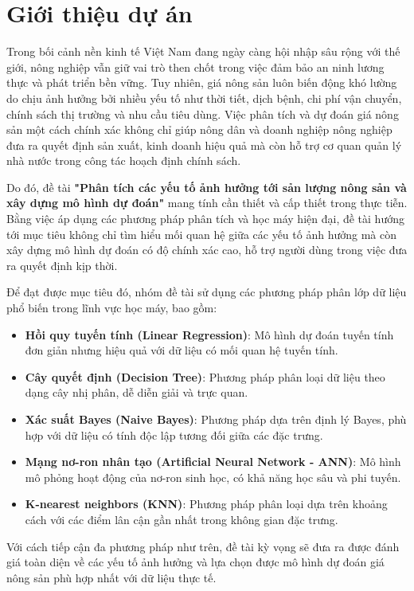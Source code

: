 \section{Giới thiệu dự án}

Trong bối cảnh nền kinh tế Việt Nam đang ngày càng hội nhập sâu rộng với thế giới, nông nghiệp vẫn giữ vai trò then chốt trong việc đảm bảo an ninh lương thực và phát triển bền vững. Tuy nhiên, giá nông sản luôn biến động khó lường do chịu ảnh hưởng bởi nhiều yếu tố như thời tiết, dịch bệnh, chi phí vận chuyển, chính sách thị trường và nhu cầu tiêu dùng. Việc phân tích và dự đoán giá nông sản một cách chính xác không chỉ giúp nông dân và doanh nghiệp nông nghiệp đưa ra quyết định sản xuất, kinh doanh hiệu quả mà còn hỗ trợ cơ quan quản lý nhà nước trong công tác hoạch định chính sách.

Do đó, đề tài \textbf{"Phân tích các yếu tố ảnh hưởng tới sản lượng nông sản và xây dựng mô hình dự đoán"} mang tính cần thiết và cấp thiết trong thực tiễn. Bằng việc áp dụng các phương pháp phân tích và học máy hiện đại, đề tài hướng tới mục tiêu không chỉ tìm hiểu mối quan hệ giữa các yếu tố ảnh hưởng mà còn xây dựng mô hình dự đoán có độ chính xác cao, hỗ trợ người dùng trong việc đưa ra quyết định kịp thời.

Để đạt được mục tiêu đó, nhóm đề tài sử dụng các phương pháp phân lớp dữ liệu phổ biến trong lĩnh vực học máy, bao gồm:

\begin{itemize}
    \item \textbf{Hồi quy tuyến tính (Linear Regression)}: Mô hình dự đoán tuyến tính đơn giản nhưng hiệu quả với dữ liệu có mối quan hệ tuyến tính.
    \item \textbf{Cây quyết định (Decision Tree)}: Phương pháp phân loại dữ liệu theo dạng cây nhị phân, dễ diễn giải và trực quan.
    \item \textbf{Xác suất Bayes (Naive Bayes)}: Phương pháp dựa trên định lý Bayes, phù hợp với dữ liệu có tính độc lập tương đối giữa các đặc trưng.
    \item \textbf{Mạng nơ-ron nhân tạo (Artificial Neural Network - ANN)}: Mô hình mô phỏng hoạt động của nơ-ron sinh học, có khả năng học sâu và phi tuyến.
    \item \textbf{K-nearest neighbors (KNN)}: Phương pháp phân loại dựa trên khoảng cách với các điểm lân cận gần nhất trong không gian đặc trưng.
\end{itemize}

Với cách tiếp cận đa phương pháp như trên, đề tài kỳ vọng sẽ đưa ra được đánh giá toàn diện về các yếu tố ảnh hưởng và lựa chọn được mô hình dự đoán giá nông sản phù hợp nhất với dữ liệu thực tế.
